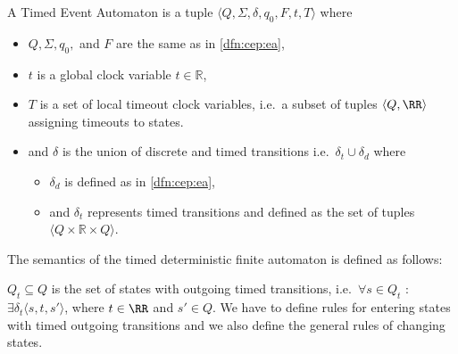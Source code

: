 			\begin{dfn}
				\label{dfn:cep:tea}
				A Timed Event Automaton is a tuple $\langle Q,\Sigma,\delta,q_0, F, t, T \rangle$ where
				\begin{itemize}
					\item $Q, \Sigma, q_0,$ and $F$ are the same as in \cref{dfn:cep:ea},
					\item $t$ is a global clock variable $t \in \mathbb{R}$,
					\item $T$ is a set of local timeout clock variables, i.e.~a subset of tuples $\langle Q, \RR \rangle$ assigning timeouts to states.
					\item and $\delta$ is the union of discrete and timed transitions i.e.~$\delta_t \cup \delta_d$ where
					\begin{itemize}
						\item $\delta_d$ is defined as in \cref{dfn:cep:ea},
						\item and $\delta_t$ represents timed transitions and defined as the set of tuples $\langle Q \times \mathbb{R} \times Q \rangle$\citep{alur1994theory}. 
					\end{itemize}
				\end{itemize}
			\end{dfn}
			
			The semantics of the timed deterministic finite automaton is defined as follows:
			
			$Q_t \subseteq Q$ is the set of states with outgoing timed transitions, 
			i.e.~$\forall s \in Q_t$ : $ \exists \delta_t\langle s, t, s' \rangle$, where $t \in \RR$ and $s' \in Q$.
			We have to define rules for entering states with timed outgoing transitions and we also define the general rules of changing states. 
			
